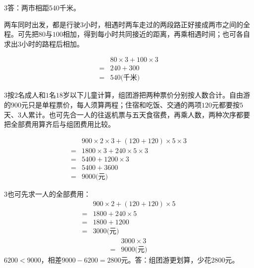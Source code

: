 \documentclass[multi=snippet,border={5bp 20bp 5bp 5bp}]{standalone}
\newenvironment{snippet}[3]{\begin{minipage}{#1bp}\color{answerred}\fontsize{#2}{#3}\selectfont\raggedright}{\end{minipage}}
\begin{document}
\begin{snippet}{505}{11.5}{14}\begin{multicols}{3}\raggedcolumns 答：两市相距540千米。\par 两车同时出发，都是行驶\(3\)\allowbreak 小时，相遇时两车走过的两段路正好接成两市之间的全程。可先把\(80\)\allowbreak 与\(100\)\allowbreak 相加，得到每小时共同接近的距离，再乘相遇时间；也可各自求出\(3\)\allowbreak 小时的路程后相加。\par \[\begin{aligned}&80\times3+100\times3\\={}&240+300\\={}&540\text{(千米)}\end{aligned}\]\end{multicols}\end{snippet}
\begin{snippet}{505}{11.5}{14}\begin{multicols}{3}\raggedcolumns 按\(2\)\allowbreak 名成人和\(1\)\allowbreak 名\(18\)\allowbreak 岁以下儿童计算，组团游把两种票价分别按人数合计。自由游的\(900\)\allowbreak 元只是单程票价，每人须算两程；住宿和吃饭、交通的两项\(120\)\allowbreak 元都要按\(5\)\allowbreak 天、\(3\)\allowbreak 人累计。也可先合一人的往返机票与五天食宿费，再乘人数，两种次序都要把全部费用算齐后与组团费用比较。\par \end{multicols}\[\begin{aligned}&900\times2\times3+(120+120)\times5\times3\\={}&1800\times3+240\times5\times3\\={}&5400+1200\times3\\={}&5400+3600\\={}&9000\text{(元)}\end{aligned}\]\begin{multicols}{3}\raggedcolumns 也可先求一人的全部费用：\[\begin{aligned}&900\times2+(120+120)\times5\\={}&1800+240\times5\\={}&1800+1200\\={}&3000\text{(元)}\end{aligned}\]\[\begin{aligned}&3000\times3\\={}&9000\text{(元)}\end{aligned}\]\(6200<9000\)\allowbreak ，相差\(9000-6200=2800\)\allowbreak 元。答：组团游更划算，少花2800元。\end{multicols}\end{snippet}
\end{document}

